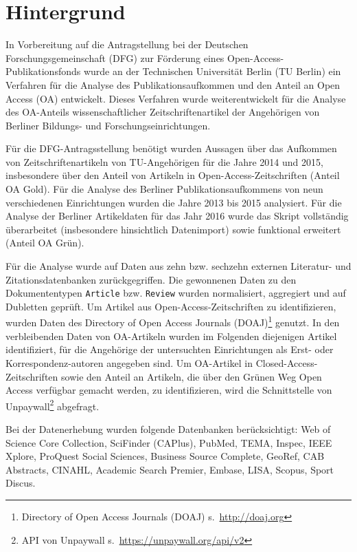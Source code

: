 \section{Hintergrund}
\label{hintergrund}
In Vorbereitung auf die Antragstellung bei der Deutschen Forschungsgemeinschaft (DFG) zur Förderung eines Open-Access-Publikationsfonds wurde an der Technischen Universität Berlin (TU Berlin) ein Verfahren für die Analyse des Publikationsaufkommen und den Anteil an Open Access (OA) entwickelt. Dieses Verfahren wurde weiterentwickelt für die Analyse des OA-Anteils wissenschaftlicher Zeitschriftenartikel der Angehörigen von Berliner Bildungs- und Forschungseinrichtungen.

Für die DFG-Antragsstellung benötigt wurden Aussagen über das Aufkommen von Zeitschriftenartikeln von TU-Angehörigen für die  Jahre 2014 und 2015, insbesondere über den Anteil von Artikeln in Open-Access-Zeitschriften (Anteil OA Gold). Für die Analyse des Berliner Publikationsaufkommens von neun verschiedenen Einrichtungen wurden die Jahre 2013 bis 2015 analysiert. Für die Analyse der Berliner Artikeldaten für das Jahr 2016 wurde das Skript vollständig überarbeitet (insbesondere hinsichtlich Datenimport) sowie funktional erweitert (Anteil OA Grün).

Für die Analyse wurde auf Daten aus zehn bzw. sechzehn externen Literatur- und Zitations\-datenbanken zurückgegriffen.
Die gewonnenen Daten zu den Dokumententypen \texttt{Article} bzw. \texttt{Review} wurden normalisiert, aggregiert und auf Dubletten geprüft. Um Artikel aus Open-Access-Zeitschriften zu identifizieren, wurden Daten des Directory of Open Access Journals (DOAJ)\footnote{Directory of Open Access Journals (DOAJ) s.~\url{http://doaj.org}} genutzt. In den verbleibenden Daten von OA-Artikeln wurden im Folgenden diejenigen Artikel identifiziert, für die Angehörige der untersuchten Einrichtungen als Erst- oder Korrespondenz-autoren angegeben sind. Um OA-Artikel in Closed-Access-Zeitschriften sowie den Anteil an Artikeln, die über den Grünen Weg Open Access verfügbar gemacht werden, zu identifizieren, wird die Schnittstelle von Unpaywall\footnote{API von Unpaywall s.~\url{https://unpaywall.org/api/v2}} abgefragt.

Bei der Datenerhebung wurden folgende Datenbanken berücksichtigt: Web of Science Core Collection, SciFinder (CAPlus), PubMed, TEMA, Inspec, IEEE Xplore, ProQuest Social Sciences, Business Source Complete, GeoRef, CAB Abstracts, CINAHL, Academic Search Premier, Embase, LISA, Scopus, Sport Discus.

